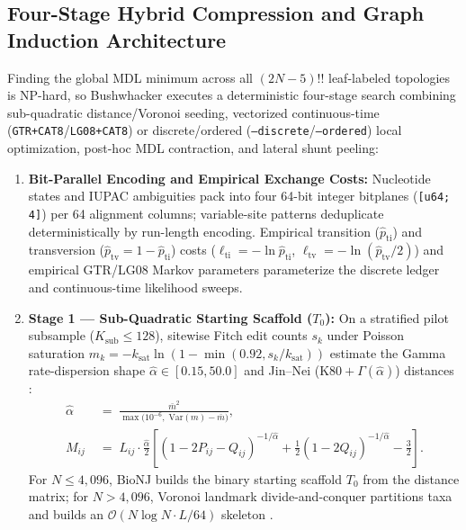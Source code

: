 \documentclass[12pt]{article}
\begin{document}
\subsection*{Four-Stage Hybrid Compression and Graph Induction Architecture}

Finding the global MDL minimum across all $(2N-5)!!$ leaf-labeled topologies is NP-hard, so Bushwhacker executes a deterministic four-stage search combining sub-quadratic distance/Voronoi seeding, vectorized continuous-time (\texttt{GTR+CAT8}/\texttt{LG08+CAT8}) or discrete/ordered (\texttt{--discrete}/\texttt{--ordered}) local optimization, post-hoc MDL contraction, and lateral shunt peeling:
\begin{enumerate}
    \item \textbf{Bit-Parallel Encoding and Empirical Exchange Costs:} Nucleotide states and IUPAC ambiguities pack into four 64-bit integer bitplanes (\texttt{[u64; 4]}) per 64 alignment columns; variable-site patterns deduplicate deterministically by run-length encoding. Empirical transition ($\hat{p}_{\text{ti}}$) and transversion ($\hat{p}_{\text{tv}} = 1 - \hat{p}_{\text{ti}}$) costs ($\ell_{\text{ti}} = -\ln\hat{p}_{\text{ti}}$, $\ell_{\text{tv}} = -\ln(\hat{p}_{\text{tv}}/2)$) and empirical GTR/LG08 Markov parameters parameterize the discrete ledger and continuous-time likelihood sweeps.
    \item \textbf{Stage 1 --- Sub-Quadratic Starting Scaffold ($T_0$):} On a stratified pilot subsample ($K_{\text{sub}} \le 128$), sitewise Fitch edit counts $s_k$ \cite{fitch1971toward} under Poisson saturation $m_k = -k_{\text{sat}}\ln(1 - \min(0.92, s_k / k_{\text{sat}}))$ estimate the Gamma rate-dispersion shape $\hat{\alpha} \in [0.15, 50.0]$ and Jin--Nei ($\text{K80}+\Gamma(\hat{\alpha})$) distances \cite{jin1990limitations}:
    \begin{equation}
        \begin{aligned}
            \hat{\alpha} &\;=\; \frac{\bar{m}^2}{\max\!\big(10^{-6},\; \text{Var}(m) - \bar{m}\big)}, \\
            M_{ij} &\;=\; L_{ij} \cdot \frac{\hat{\alpha}}{2}\!\left[ (1 - 2P_{ij} - Q_{ij})^{-1/\hat{\alpha}} + \frac{1}{2}(1 - 2Q_{ij})^{-1/\hat{\alpha}} - \frac{3}{2} \right].
        \end{aligned}
        \label{eq:jin_nei}
    \end{equation}
    For $N \le 4{,}096$, BioNJ builds the binary starting scaffold $T_0$ from the distance matrix; for $N > 4{,}096$, Voronoi landmark divide-and-conquer partitions taxa and builds an $\mathcal{O}(N\log N \cdot L/64)$ skeleton \cite{guindon2010new}.

\end{enumerate}
\end{document}
